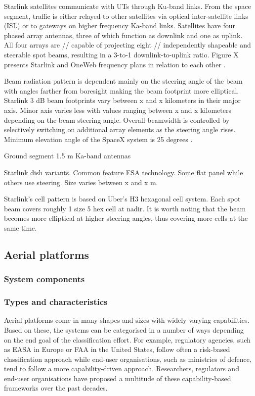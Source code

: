 \documentclass[english, 12pt, a4paper, elec, utf8, a-1b, online]{aaltothesis}
\begin{document}
Starlink satellites communicate with UTs through Ku-band links.
From the space segment, traffic is either relayed to other satellites via optical inter-satellite links (ISL) or to gateways on higher frequency Ka-band links.
Satellites have four phased array antennas, three of which function as downlink and one as uplink.
All four arrays are // capable of projecting eight // independently shapeable and steerable spot beams, resulting in a 3-to-1 downlink-to-uplink ratio.
Figure X presents Starlink and OneWeb frequency plans in relation to each other \cite{spacex2016loa}.

Beam radiation pattern is dependent mainly on the steering angle of the beam with angles farther from boresight making the beam footprint more elliptical.
Starlink 3 dB beam footprints vary between x and x kilometers in their major axis.
Minor axis varies less with values ranging between x and x kilometers depending on the beam steering angle.
Overall beamwidth is controlled by selectively switching on additional array elements as the steering angle rises.
Minimum elevation angle of the SpaceX system is 25 degrees \cite{spacex2016loa, spacex2020mod}.

Ground segment 1.5 m Ka-band antennas

Starlink dish variants. Common feature ESA technology. Some flat panel while others use steering. Size varies between x and x m.

Starlink's cell pattern is based on Uber's H3 hexagonal cell system. Each spot beam covers roughly 1 size 5 hex cell at nadir. It is worth noting that the beam becomes more elliptical at higher steering angles, thus covering more cells at the same time.

\subsection{Aerial platforms} \label{sect-aerial-platforms}
\subsubsection{System components}

\subsubsection{Types and characteristics}

Aerial platforms come in many shapes and sizes with widely varying capabilities.
Based on these, the systems can be categorised in a number of ways depending on the end goal of the classification effort.
For example, regulatory agencies, such as EASA in Europe or FAA in the United States, follow often a risk-based classification approach while end-user organisations, such as ministries of defence, tend to follow a more capability-driven approach.
Researchers, regulators and end-user organisations have proposed a multitude of these capability-based frameworks over the past decades.\cite{hassanalian2017classifications, telli2023comprehensive, ukmod2020remotely}
\end{document}
